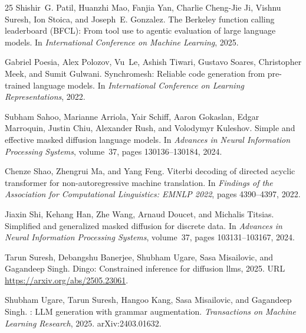 \documentclass{article}
\begin{document}
\begin{thebibliography}{25}
Shishir~G. Patil, Huanzhi Mao, Fanjia Yan, Charlie Cheng-Jie Ji, Vishnu Suresh,
  Ion Stoica, and Joseph~E. Gonzalez.
\newblock The {Berkeley} function calling leaderboard ({BFCL}): From tool use
  to agentic evaluation of large language models.
\newblock In \emph{International Conference on Machine Learning}, 2025.

Gabriel Poesia, Alex Polozov, Vu~Le, Ashish Tiwari, Gustavo Soares, Christopher
  Meek, and Sumit Gulwani.
\newblock Synchromesh: Reliable code generation from pre-trained language
  models.
\newblock In \emph{International Conference on Learning Representations}, 2022.

Subham Sahoo, Marianne Arriola, Yair Schiff, Aaron Gokaslan, Edgar Marroquin,
  Justin Chiu, Alexander Rush, and Volodymyr Kuleshov.
\newblock Simple and effective masked diffusion language models.
\newblock In \emph{Advances in Neural Information Processing Systems},
  volume~37, pages 130136--130184, 2024.

Chenze Shao, Zhengrui Ma, and Yang Feng.
\newblock Viterbi decoding of directed acyclic transformer for
  non-autoregressive machine translation.
\newblock In \emph{Findings of the Association for Computational Linguistics:
  EMNLP 2022}, pages 4390--4397, 2022.

Jiaxin Shi, Kehang Han, Zhe Wang, Arnaud Doucet, and Michalis Titsias.
\newblock Simplified and generalized masked diffusion for discrete data.
\newblock In \emph{Advances in Neural Information Processing Systems},
  volume~37, pages 103131--103167, 2024.

Tarun Suresh, Debangshu Banerjee, Shubham Ugare, Sasa Misailovic, and Gagandeep
  Singh.
\newblock Dingo: Constrained inference for diffusion llms, 2025.
\newblock URL \url{https://arxiv.org/abs/2505.23061}.

Shubham Ugare, Tarun Suresh, Hangoo Kang, Sasa Misailovic, and Gagandeep Singh.
: {LLM} generation with grammar augmentation.
\newblock \emph{Transactions on Machine Learning Research}, 2025.
\newblock arXiv:2403.01632.


\end{thebibliography}
\end{document}
